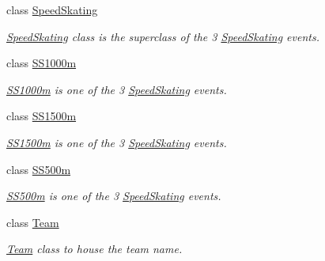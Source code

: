 \begin{DoxyCompactItemize}
class \hyperlink{classPCO_1_1SpeedSkating}{Speed\+Skating}
\begin{DoxyCompactList}\small\item\em \hyperlink{classPCO_1_1SpeedSkating}{Speed\+Skating} class is the superclass of the 3 \hyperlink{classPCO_1_1SpeedSkating}{Speed\+Skating} events. \end{DoxyCompactList}\item 
class \hyperlink{classPCO_1_1SS1000m}{S\+S1000m}
\begin{DoxyCompactList}\small\item\em \hyperlink{classPCO_1_1SS1000m}{S\+S1000m} is one of the 3 \hyperlink{classPCO_1_1SpeedSkating}{Speed\+Skating} events. \end{DoxyCompactList}\item 
class \hyperlink{classPCO_1_1SS1500m}{S\+S1500m}
\begin{DoxyCompactList}\small\item\em \hyperlink{classPCO_1_1SS1500m}{S\+S1500m} is one of the 3 \hyperlink{classPCO_1_1SpeedSkating}{Speed\+Skating} events. \end{DoxyCompactList}\item 
class \hyperlink{classPCO_1_1SS500m}{S\+S500m}
\begin{DoxyCompactList}\small\item\em \hyperlink{classPCO_1_1SS500m}{S\+S500m} is one of the 3 \hyperlink{classPCO_1_1SpeedSkating}{Speed\+Skating} events. \end{DoxyCompactList}\item 
class \hyperlink{classPCO_1_1Team}{Team}
\begin{DoxyCompactList}\small\item\em \hyperlink{classPCO_1_1Team}{Team} class to house the team name. \end{DoxyCompactList}\end{DoxyCompactItemize}
